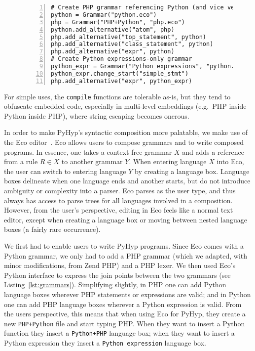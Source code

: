\documentclass[a4paper,UKenglish]{lipics-v2016}
\newcommand{\ourvm}{PyHyp\xspace}
\begin{document}
\begin{figure}
\begin{lstlisting}[caption={Composing PHP and Python grammars in Eco.
    \texttt{Grammar(n, p)} loads a grammar named \texttt{n} from path \texttt{p}.
    \texttt{change\_start} changes the start rule of a grammar.
    \texttt{g1.add\_alternative(r, g2)} adds a new alternative to the rule
    \texttt{r} in grammar \texttt{g1} to the start rule of grammar
\texttt{g2}.}, label={lst:grammars}, numbers=left]
# Create PHP grammar referencing Python (and vice versa)
python = Grammar("python.eco")
php = Grammar("PHP+Python", "php.eco")
python.add_alternative("atom", php)
php.add_alternative("top_statement", python)
php.add_alternative("class_statement", python)
php.add_alternative("expr", python)
# Create Python expressions-only grammar
python_expr = Grammar("Python expressions", "python.eco")
python_expr.change_start("simple_stmt")
php.add_alternative("expr", python_expr)
\end{lstlisting}
\end{figure}

For simple uses, the \texttt{compile} functions are tolerable as-is, but
they tend to obfuscate embedded code, especially in multi-level embeddings
(e.g.~PHP inside Python inside PHP), where string escaping becomes onerous.

In order to make \ourvm's syntactic composition more palatable, we make
use of the Eco editor~\cite{diekmann14eco}. Eco allows users to compose grammars
and to write composed programs. In essence, one takes a
context-free grammar $X$ and adds a reference from a rule $R \in X$
to another grammar $Y$. When entering
language $X$ into Eco, the user can switch to entering language $Y$ by creating a
language box. Language boxes delineate when one
language ends and another starts, but do not introduce ambiguity or complexity into a parser.
Eco parses as the user type, and thus always has access to
parse trees for all languages involved in a composition. However, from
the user's perspective, editing in Eco feels like a normal text
editor, except when creating a language box or moving between nested language boxes (a
fairly rare occurrence).

We first had to enable users to write \ourvm programs. Since Eco comes with a Python
grammar, we only had to add a PHP grammar (which we adapted, with
minor modifications, from Zend PHP) and a PHP lexer. We then used Eco's
Python interface to express the join points between the two
grammars (see Listing~\ref{lst:grammars}). Simplifying slightly, in PHP one
can add Python language boxes wherever PHP statements or expressions are
valid; and in Python one can add PHP language boxes wherever a Python
expression is valid. From the users perspective, this means that when using Eco for \ourvm,
they create a new \texttt{PHP+Python} file and start typing PHP. When they
want to insert a Python function they insert a \texttt{Python+PHP} language box;
when they want to insert a Python expression they insert a \texttt{Python
expression} language box.
\end{document}
